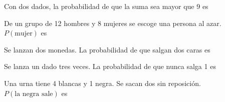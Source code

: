 \bitacora

\evaluacion
\begin{ejercicios}
\item Con dos dados, la probabilidad de que la suma sea mayor que 9 es
\item De un grupo de 12 hombres y 8 mujeres se escoge una persona al azar. $P(\text{mujer})$ es
\item Se lanzan dos monedas. La probabilidad de que salgan dos caras es
\item Se lanza un dado tres veces. La probabilidad de que nunca salga 1 es
\item Una urna tiene 4 blancas y 1 negra. Se sacan dos sin reposición. $P(\text{la negra sale})$ es
\end{ejercicios}
